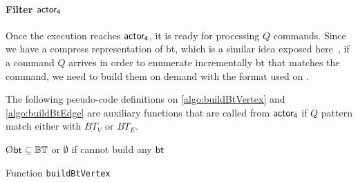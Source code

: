 \paragraph{Filter $\mathsf{actor_4}$} Once the execution reaches $\mathsf{actor_4}$, it is ready for processing $Q$ commands. Since we have a compress representation of \acrshort{bt}, which is a similar idea exposed here~\cite{Lai}, if a command $Q$ arrives in order 
to enumerate incrementally \acrshort{bt} that matches the command, we need to build them on demand with the format used on .

The following pseudo-code definitions on \autoref{algo:buildBtVertex} and \autoref{algo:buildBtEdge} are auxiliary functions that are called
from $\mathsf{actor_4}$ if $Q$ pattern match either with $BT_V$ or $BT_E$.

\begin{algorithm}
\SetAlgoRefName{[A9]}
\O{$\mathsf{bt} \subseteq \mathbb{BT}$ or $\emptyset$ if cannot build any $\mathsf{bt}$}
\caption{Function \texttt{buildBtVertex}}
\label{algo:buildBtVertex}
\end{algorithm}

